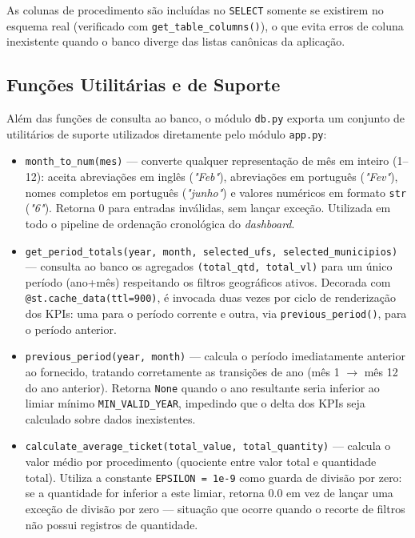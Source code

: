 \documentclass[12pt,a4paper]{report}
\begin{document}
As colunas de procedimento são incluídas no \texttt{SELECT} somente se existirem no
esquema real (verificado com \texttt{get\_table\_columns()}), o que evita erros de
coluna inexistente quando o banco diverge das listas canônicas da aplicação.

\subsection{Funções Utilitárias e de Suporte}

Além das funções de consulta ao banco, o módulo \texttt{db.py} exporta um conjunto
de utilitários de suporte utilizados diretamente pelo módulo \texttt{app.py}:

\begin{itemize}
    \item \texttt{month\_to\_num(mes)} — converte qualquer representação de mês em
    inteiro (1--12): aceita abreviações em inglês (\textit{"Feb"}), abreviações em
    português (\textit{"Fev"}), nomes completos em português (\textit{"junho"}) e
    valores numéricos em formato \texttt{str} (\textit{"6"}). Retorna 0 para entradas
    inválidas, sem lançar exceção. Utilizada em todo o pipeline de ordenação
    cronológica do \textit{dashboard}.

    \item \texttt{get\_period\_totals(year, month, selected\_ufs, selected\_municipios)}
    — consulta ao banco os agregados \texttt{(total\_qtd, total\_vl)} para um único
    período (ano+mês) respeitando os filtros geográficos ativos. Decorada com
    \texttt{@st.cache\_data(ttl=900)}, é invocada duas vezes por ciclo de renderização
    dos KPIs: uma para o período corrente e outra, via \texttt{previous\_period()},
    para o período anterior.

    \item \texttt{previous\_period(year, month)} — calcula o período imediatamente
    anterior ao fornecido, tratando corretamente as transições de ano (mês 1 $\rightarrow$ mês 12
    do ano anterior). Retorna \texttt{None} quando o ano resultante seria inferior ao
    limiar mínimo \texttt{MIN\_VALID\_YEAR}, impedindo que o delta dos KPIs seja
    calculado sobre dados inexistentes.

    \item \texttt{calculate\_average\_ticket(total\_value, total\_quantity)} — calcula
    o valor médio por procedimento (quociente entre valor total e quantidade total).
    Utiliza a constante \texttt{EPSILON = 1e-9} como guarda de divisão por zero: se
    a quantidade for inferior a este limiar, retorna 0.0 em vez de lançar uma exceção
    de divisão por zero — situação que ocorre quando o recorte de filtros não possui
    registros de quantidade.
\end{itemize}
\end{document}
